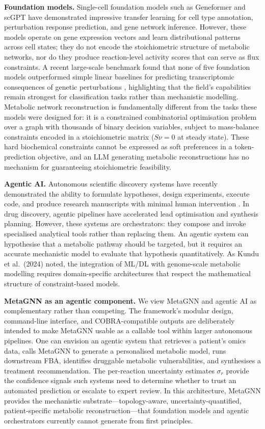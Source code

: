 \documentclass[12pt,a4paper]{article}
\begin{document}
\textbf{Foundation models.} Single-cell foundation models such as Geneformer \cite{Theodoris2023} and scGPT \cite{Cui2024} have demonstrated impressive transfer learning for cell type annotation, perturbation response prediction, and gene network inference. However, these models operate on gene expression vectors and learn distributional patterns across cell states; they do not encode the stoichiometric structure of metabolic networks, nor do they produce reaction-level activity scores that can serve as flux constraints. A recent large-scale benchmark found that none of five foundation models outperformed simple linear baselines for predicting transcriptomic consequences of genetic perturbations \cite{Luecken2025}, highlighting that the field's capabilities remain strongest for classification tasks rather than mechanistic modelling. Metabolic network reconstruction is fundamentally different from the tasks these models were designed for: it is a constrained combinatorial optimisation problem over a graph with thousands of binary decision variables, subject to mass-balance constraints encoded in a stoichiometric matrix ($S\nu = 0$ at steady state). These hard biochemical constraints cannot be expressed as soft preferences in a token-prediction objective, and an LLM generating metabolic reconstructions has no mechanism for guaranteeing stoichiometric feasibility.

\textbf{Agentic AI.} Autonomous scientific discovery systems have recently demonstrated the ability to formulate hypotheses, design experiments, execute code, and produce research manuscripts with minimal human intervention \cite{Wei2025}. In drug discovery, agentic pipelines have accelerated lead optimisation and synthesis planning. However, these systems are orchestrators: they compose and invoke specialised analytical tools rather than replacing them. An agentic system can hypothesise that a metabolic pathway should be targeted, but it requires an accurate mechanistic model to evaluate that hypothesis quantitatively. As Kundu et al.\ (2024) \cite{Kundu2024} noted, the integration of ML/DL with genome-scale metabolic modelling requires domain-specific architectures that respect the mathematical structure of constraint-based models.

\textbf{MetaGNN as an agentic component.} We view MetaGNN and agentic AI as complementary rather than competing. The framework's modular design, command-line interface, and COBRA-compatible outputs are deliberately intended to make MetaGNN usable as a callable tool within larger autonomous pipelines. One can envision an agentic system that retrieves a patient's omics data, calls MetaGNN to generate a personalised metabolic model, runs downstream FBA, identifies druggable metabolic vulnerabilities, and synthesises a treatment recommendation. The per-reaction uncertainty estimates $\sigma_r$ provide the confidence signals such systems need to determine whether to trust an automated prediction or escalate to expert review. In this architecture, MetaGNN provides the mechanistic substrate---topology-aware, uncertainty-quantified, patient-specific metabolic reconstruction---that foundation models and agentic orchestrators currently cannot generate from first principles.
\end{document}
